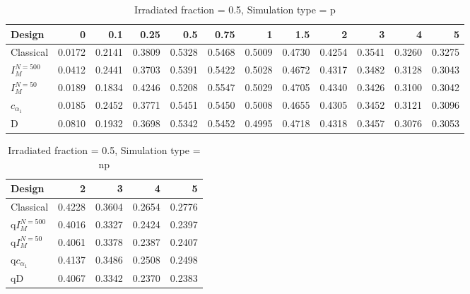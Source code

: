\documentclass[a4paper]{article}
\begin{document}
\newpage

\begin{table}[ht]
\centering
\begin{tabular}{lrrrrrrrrrrr}
  \hline
Design & 0 & 0.1 & 0.25 & 0.5 & 0.75 & 1 & 1.5 & 2 & 3 & 4 & 5 \\ 
  \hline
Classical & 0.0172 & 0.2141 & 0.3809 & 0.5328 & 0.5468 & 0.5009 & 0.4730 & 0.4254 & 0.3541 & 0.3260 & 0.3275 \\ 
  $I_M^{N=500}$ & 0.0412 & 0.2441 & 0.3703 & 0.5391 & 0.5422 & 0.5028 & 0.4672 & 0.4317 & 0.3482 & 0.3128 & 0.3043 \\ 
  $I_M^{N=50}$ & 0.0189 & 0.1834 & 0.4246 & 0.5208 & 0.5547 & 0.5029 & 0.4705 & 0.4340 & 0.3426 & 0.3100 & 0.3042 \\ 
  $c_{\alpha_1}$ & 0.0185 & 0.2452 & 0.3771 & 0.5451 & 0.5450 & 0.5008 & 0.4655 & 0.4305 & 0.3452 & 0.3121 & 0.3096 \\ 
  D & 0.0810 & 0.1932 & 0.3698 & 0.5342 & 0.5452 & 0.4995 & 0.4718 & 0.4318 & 0.3457 & 0.3076 & 0.3053 \\ 
   \hline
\end{tabular}
\caption{Irradiated fraction = 0.5, Simulation type = p} 
\end{table}

\begin{table}[ht]
\centering
\begin{tabular}{lrrrr}
  \hline
Design & 2 & 3 & 4 & 5 \\ 
  \hline
Classical & 0.4228 & 0.3604 & 0.2654 & 0.2776 \\ 
  q$I_M^{N=500}$ & 0.4016 & 0.3327 & 0.2424 & 0.2397 \\ 
  q$I_M^{N=50}$ & 0.4061 & 0.3378 & 0.2387 & 0.2407 \\ 
  q$c_{\alpha_1}$ & 0.4137 & 0.3486 & 0.2508 & 0.2498 \\ 
  qD & 0.4067 & 0.3342 & 0.2370 & 0.2383 \\ 
   \hline
\end{tabular}
\caption{Irradiated fraction = 0.5, Simulation type = np} 
\end{table}

\newpage
\end{document}
